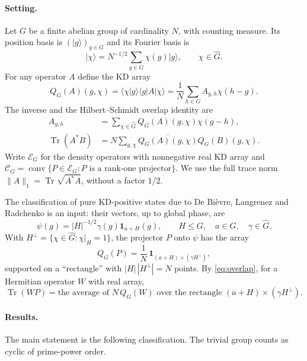 \documentclass[11pt,a4paper]{article}
\theoremstyle{definition}
\theoremstyle{plain}
\DeclareMathOperator{\Tr}{Tr}
\DeclareMathOperator{\conv}{conv}
\newcommand{\E}{\mathcal E}
\newcommand{\hull}{\mathcal C}
\newcommand{\ket}[1]{\lvert#1\rangle}
\newcommand{\bra}[1]{\langle#1\rvert}
\begin{document}
\paragraph{Setting.}
Let $G$ be a finite abelian group of cardinality $N$, with counting measure.
Its position basis is $(\ket g)_{g\in G}$ and its Fourier basis is
\[
 \ket\chi=N^{-1/2}\sum_{g\in G}\chi(g)\ket g,
 \qquad \chi\in\widehat G.
\]
For any operator $A$ define the KD array
\begin{equation}\label{eq:KD}
 Q_G(A)(g,\chi)=\bra\chi g\rangle\bra g A\ket\chi
 =\frac1N\sum_{h\in G}A_{g,h}\chi(h-g).
\end{equation}
The inverse and the Hilbert--Schmidt overlap identity are
\begin{align}
 A_{g,h}&=\sum_{\chi\in\widehat G}Q_G(A)(g,\chi)\chi(g-h),\label{eq:inverse}\\
 \Tr(A^*B)&=N\sum_{g,\chi}\overline{Q_G(A)(g,\chi)}Q_G(B)(g,\chi).
 \label{eq:overlap}
\end{align}
Write $\E_G$ for the density operators with nonnegative real KD array and
$\hull_G=\conv\{P\in\E_G:P\text{ is a rank-one projector}\}$.
We use the full trace norm $\|A\|_1=\Tr\sqrt{A^*A}$, without a factor $1/2$.

The classification of pure KD-positive states due to
De Bi\`evre, Langrenez and Radchenko \cite[Theorem~3.1]{DLR} is an input:
their vectors, up to global phase, are
\begin{equation}\label{eq:pures}
 \psi(g)=|H|^{-1/2}\gamma(g)\mathbf1_{a+H}(g),
 \qquad H\leq G,\quad a\in G,\quad\gamma\in\widehat G.
\end{equation}
With $H^\perp=\{\chi\in\widehat G:\chi|_H=1\}$, the projector $P$ onto $\psi$
has the array
\begin{equation}\label{eq:masks}
 Q_G(P)=\frac1N\,\mathbf1_{(a+H)\times(\gamma H^\perp)} ,
\end{equation}
supported on a ``rectangle'' with $|H|\,|H^\perp|=N$ points. By
\eqref{eq:overlap}, for a Hermitian operator $W$ with real array,
\begin{equation}\label{eq:average}
 \Tr(WP)=\text{the average of }N\,Q_G(W)\text{ over the rectangle }
 (a+H)\times(\gamma H^\perp).
\end{equation}

\paragraph{Results.}
The main statement is the following classification. The trivial group counts
as cyclic of prime-power order.
\end{document}
